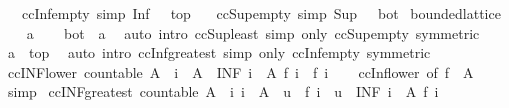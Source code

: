 \begin{isabellebody}
\ \ \ ccInf{\isacharunderscore}empty\ {\isacharbrackleft}simp{\isacharbrackright}{\isacharcolon}\ {\isachardoublequoteopen}Inf\ {\isacharbraceleft}{\isacharbraceright}\ {\isacharequal}\ top{\isachardoublequoteclose}\isanewline
\ \ \ ccSup{\isacharunderscore}empty\ {\isacharbrackleft}simp{\isacharbrackright}{\isacharcolon}\ {\isachardoublequoteopen}Sup\ {\isacharbraceleft}{\isacharbraceright}\ {\isacharequal}\ bot{\isachardoublequoteclose}\isanewline
{}\isanewline
\isanewline
{}\isamarkupfalse%
\ bounded{\isacharunderscore}lattice\isanewline
%
\isadelimproof
%
\endisadelimproof
%
\isatagproof
{}\isamarkupfalse%
\isanewline
\ \ \isamarkupfalse%
\ a\isanewline
\ \ \isamarkupfalse%
\ {\isachardoublequoteopen}bot\ {\isasymle}\ a{\isachardoublequoteclose}\ \isamarkupfalse%
\ {\isacharparenleft}auto\ intro{\isacharcolon}\ ccSup{\isacharunderscore}least\ simp\ only{\isacharcolon}\ ccSup{\isacharunderscore}empty\ {\isacharbrackleft}symmetric{\isacharbrackright}{\isacharparenright}\isanewline
\ \ \isamarkupfalse%
\ {\isachardoublequoteopen}a\ {\isasymle}\ top{\isachardoublequoteclose}\ \isamarkupfalse%
\ {\isacharparenleft}auto\ intro{\isacharcolon}\ ccInf{\isacharunderscore}greatest\ simp\ only{\isacharcolon}\ ccInf{\isacharunderscore}empty\ {\isacharbrackleft}symmetric{\isacharbrackright}{\isacharparenright}\isanewline
{}\isamarkupfalse%
%
\endisatagproof
{\isafoldproof}%
%
\isadelimproof
\isanewline
%
\endisadelimproof
\isanewline
{}\isamarkupfalse%
\ ccINF{\isacharunderscore}lower{\isacharcolon}\ {\isachardoublequoteopen}countable\ A\ {\isasymLongrightarrow}\ i\ {\isasymin}\ A\ {\isasymLongrightarrow}\ {\isacharparenleft}INF\ i\ {\isasymin}\ A{\isachardot}\ f\ i{\isacharparenright}\ {\isasymle}\ f\ i{\isachardoublequoteclose}\isanewline
%
\isadelimproof
\ \ %
\endisadelimproof
%
\isatagproof
{}\isamarkupfalse%
\ ccInf{\isacharunderscore}lower\ {\isacharbrackleft}of\ {\isachardoublequoteopen}f\ {\isacharbackquote}\ A{\isachardoublequoteclose}{\isacharbrackright}\ \isamarkupfalse%
\ simp%
\endisatagproof
{\isafoldproof}%
%
\isadelimproof
\isanewline
%
\endisadelimproof
\isanewline
{}\isamarkupfalse%
\ ccINF{\isacharunderscore}greatest{\isacharcolon}\ {\isachardoublequoteopen}countable\ A\ {\isasymLongrightarrow}\ {\isacharparenleft}{\isasymAnd}i{\isachardot}\ i\ {\isasymin}\ A\ {\isasymLongrightarrow}\ u\ {\isasymle}\ f\ i{\isacharparenright}\ {\isasymLongrightarrow}\ u\ {\isasymle}\ {\isacharparenleft}INF\ i\ {\isasymin}\ A{\isachardot}\ f\ i{\isacharparenright}{\isachardoublequoteclose}\isanewline

\end{isabellebody}

